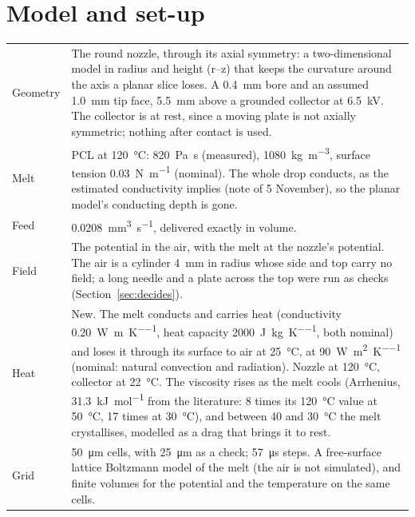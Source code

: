 \documentclass[10pt,a4paper]{article}
\begin{document}
\section{Model and set-up}

\begin{tabularx}{\textwidth}{@{}>{\leavevmode\sffamily\small\color{inktwo}}p{2.2cm}L@{}}
\toprule
Geometry & The round nozzle, through its axial symmetry: a two-dimensional model in radius and height
  (r--z) that keeps the curvature around the axis a planar slice loses. A \qty{0.4}{\milli\metre} bore and an
  assumed \qty{1.0}{\milli\metre} tip face, \qty{5.5}{\milli\metre} above a grounded collector at
  \qty{6.5}{\kilo\volt}. The collector is at rest, since a moving plate is not axially symmetric; nothing after
  contact is used. \\
Melt & PCL at \qty{120}{\celsius}: \qty{820}{\pascal\second} (measured),
  \qty{1080}{\kilo\gram\per\cubic\metre}, surface tension \qty{0.03}{\newton\per\metre} (nominal). The whole
  drop conducts, as the estimated conductivity implies (note of 5 November), so the planar model's conducting
  depth is gone. \\
Feed & \qty{0.0208}{\cubic\milli\metre\per\second}, delivered exactly in volume. \\
Field & The potential in the air, with the melt at the nozzle's potential. The air is a cylinder
  \qty{4}{\milli\metre} in radius whose side and top carry no field; a long needle and a plate across the top
  were run as checks (Section~\ref{sec:decides}). \\
Heat & New. The melt conducts and carries heat (conductivity \qty{0.20}{\watt\per\metre\per\kelvin}, heat
  capacity \qty{2000}{\joule\per\kilo\gram\per\kelvin}, both nominal) and loses it through its surface to air
  at \qty{25}{\celsius}, at \qty{90}{\watt\per\square\metre\per\kelvin} (nominal: natural convection and
  radiation). Nozzle at \qty{120}{\celsius}, collector at \qty{22}{\celsius}. The viscosity rises as the melt
  cools (Arrhenius, \qty{31.3}{\kilo\joule\per\mole} from the literature: 8 times its \qty{120}{\celsius}
  value at \qty{50}{\celsius}, 17 times at \qty{30}{\celsius}), and between 40 and \qty{30}{\celsius} the melt
  crystallises, modelled as a drag that brings it to rest. \\
Grid & \qty{50}{\micro\metre} cells, with \qty{25}{\micro\metre} as a check; \qty{57}{\micro\second} steps.
  A free-surface lattice Boltzmann model of the melt (the air is not simulated), and finite volumes for the
  potential and the temperature on the same cells. \\
\bottomrule
\end{tabularx}
\end{document}
